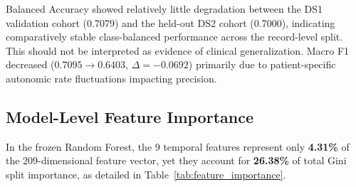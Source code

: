\documentclass[conference]{IEEEtran}
\begin{document}
Balanced Accuracy showed relatively little degradation between the DS1 validation cohort (0.7079) and the held-out DS2 cohort (0.7000), indicating comparatively stable class-balanced performance across the record-level split. This should not be interpreted as evidence of clinical generalization. Macro F1 decreased ($0.7095 \to 0.6403$, $\Delta = -0.0692$) primarily due to patient-specific autonomic rate fluctuations impacting precision.

\subsection{Model-Level Feature Importance}
In the frozen Random Forest, the 9 temporal features represent only \textbf{4.31\%} of the 209-dimensional feature vector, yet they account for \textbf{26.38\%} of total Gini split importance, as detailed in Table~\ref{tab:feature_importance}.
\end{document}
